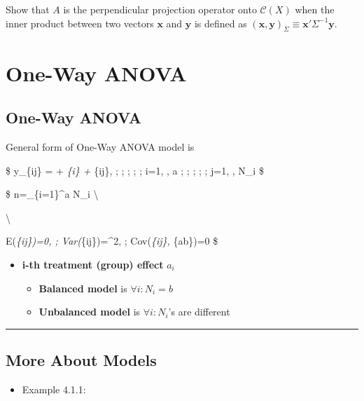 \documentclass[
]{book}
\providecommand{\tightlist}{%
  \setlength{\itemsep}{0pt}\setlength{\parskip}{0pt}}
\begin{document}
{{{Show that \(A\) is the perpendicular projection operator onto \(\mathcal{C}(X)\) when the inner product between two vectors \(\pmb x\) and \(\pmb y\) is defined as \((\pmb x, \pmb y)_\Sigma \equiv \pmb x' \Sigma^{-1} \pmb y\).

\hypertarget{one-way-anova}{%
\section{One-Way ANOVA}\label{one-way-anova}}

\hypertarget{one-way-anova-1}{%
\subsection{One-Way ANOVA}\label{one-way-anova-1}}

General form of One-Way ANOVA model is

\$
y\_\{ij\} = \mu + \alpha\emph{\{i\} + \epsilon}\{ij\}, ; ; ; ; ; i=1, \cdots, a ; ; ; ; ; j=1, \cdots, N\_i
\$

\$
n=\sum\_\{i=1\}\^{}a N\_i \textbackslash{}

\textbackslash{}

E(\epsilon\emph{\{ij\})=0, ; Var(\epsilon}\{ij\})=\sigma\^{}2, ; Cov(\epsilon\emph{\{ij\}, \epsilon}\{ab\})=0
\$

\begin{itemize}
\tightlist
\item
  \textbf{i-th treatment (group) effect} \(a_i\)

  \begin{itemize}
  \tightlist
  \item
    \textbf{Balanced model} is \(\forall i: N_i = b\)
  \item
    \textbf{Unbalanced model} is \(\forall i: N_i\)'s are different
  \end{itemize}
\end{itemize}

\begin{center}\rule{0.5\linewidth}{0.5pt}\end{center}

\hypertarget{more-about-models}{%
\subsection{More About Models}\label{more-about-models}}

\begin{itemize}
\tightlist
\item
  Example 4.1.1:
\end{itemize}

}}}
\end{document}
